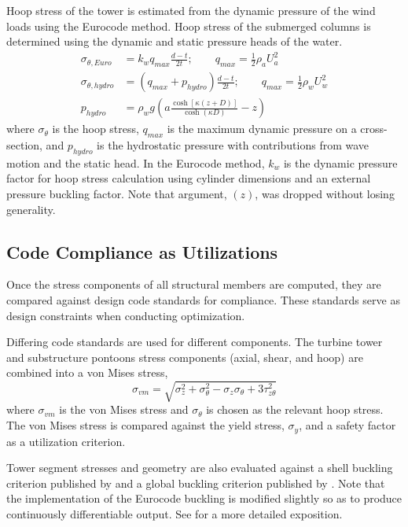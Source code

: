 Hoop
stress of the tower is estimated from the dynamic pressure of the
wind loads using the Eurocode method.  Hoop stress of the submerged
columns is determined using the dynamic and static pressure heads of the
water.
\begin{align*}
  \sigma_{\theta,Euro} &= k_w q_{max} \frac{d-t}{2t};\qquad q_{max} =
                         \frac{1}{2}\rho_a U_a^2\\
  \sigma_{\theta,hydro} &= \left(q_{max}+p_{hydro}\right) \frac{d-t}{2t};\qquad q_{max} =
                          \frac{1}{2}\rho_w U_w^2\\
  p_{hydro} &= \rho_w g \left( a\frac{\cosh\left[\kappa\left(z + D \right)\right]}{\cosh\left(\kappa D\right)} - z\right)
\end{align*}
where $\sigma_{\theta}$ is the hoop stress, $q_{max}$ is the maximum
dynamic pressure on a cross-section, and $p_{hydro}$ is the hydrostatic
pressure with contributions from wave motion and the static head.  In
the Eurocode method, $k_w$ is the dynamic pressure factor for hoop
stress calculation using cylinder dimensions and an external pressure
buckling factor.  Note that argument, $(z)$, was dropped without losing
generality.



\subsection{Code Compliance as Utilizations}
Once the stress components of all structural members are computed, they
are compared against design code standards for compliance.
These standards serve as design constraints when conducting optimization.

Differing code standards are used for different components.  The turbine
tower and substructure pontoons stress components (axial, shear, and
hoop) are combined into a von Mises stress, 
\[
  \sigma_{vm} = \sqrt{\sigma_z^2 + \sigma_{\theta}^2 -
    \sigma_z\sigma_{\theta} + 3\tau_{z\theta}^2}
\]
where $\sigma_{vm}$ is the von Mises stress and $\sigma_{\theta}$ is chosen
as the relevant hoop stress.  The von Mises stress is compared against
the yield stress, $\sigma_y$, and a safety factor as a utilization criterion.

Tower segment stresses and geometry are also evaluated against a shell
buckling criterion published by \citet{Eurocode} and a global buckling
criterion published by \citet{Germanischer}.  Note that the implementation of the
Eurocode buckling is modified slightly so as to produce continuously
differentiable output.  See \citet{JacketSE} for a more detailed
exposition.

